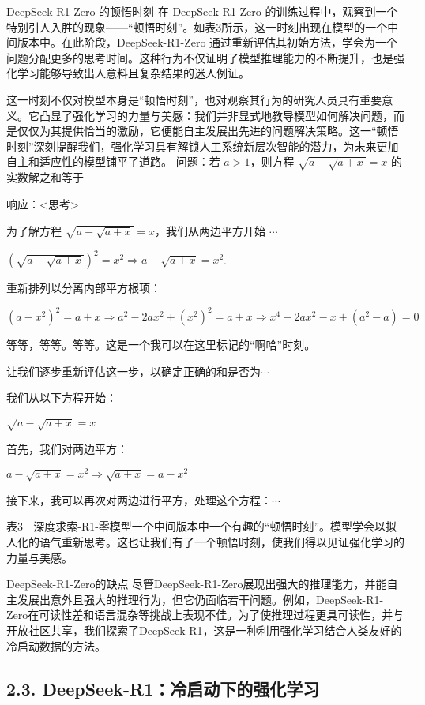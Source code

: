 \documentclass[12pt,a4paper]{report} %
\begin{document}
DeepSeek-R1-Zero 的顿悟时刻  在 DeepSeek-R1-Zero 的训练过程中，观察到一个特别引人入胜的现象——“顿悟时刻”。如表3所示，这一时刻出现在模型的一个中间版本中。在此阶段，DeepSeek-R1-Zero 通过重新评估其初始方法，学会为一个问题分配更多的思考时间。这种行为不仅证明了模型推理能力的不断提升，也是强化学习能够导致出人意料且复杂结果的迷人例证。


这一时刻不仅对模型本身是“顿悟时刻”，也对观察其行为的研究人员具有重要意义。它凸显了强化学习的力量与美感：我们并非显式地教导模型如何解决问题，而是仅仅为其提供恰当的激励，它便能自主发展出先进的问题解决策略。这一“顿悟时刻”深刻提醒我们，强化学习具有解锁人工系统新层次智能的潜力，为未来更加自主和适应性的模型铺平了道路。
问题：若 $a>1$，则方程 $\sqrt{a-\sqrt{a+x}}=x$ 的实数解之和等于


响应：\textless{}思考\textgreater{}


为了解方程 $\sqrt{a-\sqrt{a+x}}=x$，我们从两边平方开始 $\cdots$


$(\sqrt{a-\sqrt{a+x}})^{2}=x^{2} \Longrightarrow a-\sqrt{a+x}=x^{2}$.


重新排列以分离内部平方根项：


$\left(a-x^{2}\right)^{2}=a+x \Longrightarrow a^{2}-2 a x^{2}+\left(x^{2}\right)^{2}=a+x \Longrightarrow x^{4}-2 a x^{2}-x+\left(a^{2}-a\right)=0$


等等，等等。等等。这是一个我可以在这里标记的“啊哈”时刻。


让我们逐步重新评估这一步，以确定正确的和是否为$\cdots$


我们从以下方程开始：


$\sqrt{a-\sqrt{a+x}}=x$


首先，我们对两边平方：


$a-\sqrt{a+x}=x^{2} \Longrightarrow \sqrt{a+x}=a-x^{2}$


接下来，我可以再次对两边进行平方，处理这个方程：$\cdots$


表3 | 深度求索-R1-零模型一个中间版本中一个有趣的“顿悟时刻”。模型学会以拟人化的语气重新思考。这也让我们有了一个顿悟时刻，使我们得以见证强化学习的力量与美感。


DeepSeek-R1-Zero的缺点 尽管DeepSeek-R1-Zero展现出强大的推理能力，并能自主发展出意外且强大的推理行为，但它仍面临若干问题。例如，DeepSeek-R1-Zero在可读性差和语言混杂等挑战上表现不佳。为了使推理过程更具可读性，并与开放社区共享，我们探索了DeepSeek-R1，这是一种利用强化学习结合人类友好的冷启动数据的方法。


\subsection*{2.3. DeepSeek-R1：冷启动下的强化学习}
\end{document}
